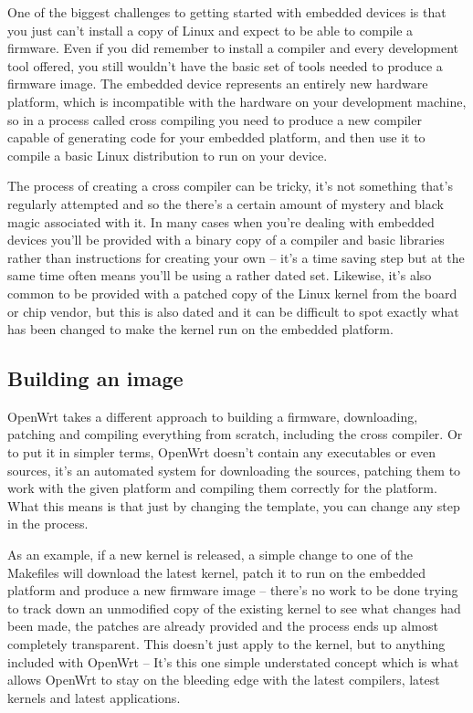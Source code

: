 One of the biggest challenges to getting started with embedded devices is that you
just can't install a copy of Linux and expect to be able to compile a firmware.
Even if you did remember to install a compiler and every development tool offered, 
you still wouldn't have the basic set of tools needed to produce a firmware image.
The embedded device represents an entirely new hardware platform, which is
incompatible with the hardware on your development machine, so in a process called 
cross compiling you need to produce a new compiler capable of generating code for
your embedded platform, and then use it to compile a basic Linux distribution to 
run on your device.

The process of creating a cross compiler can be tricky, it's not something that's 
regularly attempted and so the there's a certain amount of mystery and black magic 
associated with it. In many cases when you're dealing with embedded devices you'll
be provided with a binary copy of a compiler and basic libraries rather than 
instructions for creating your own -- it's a time saving step but at the same time 
often means you'll be using a rather dated set. Likewise, it's also common to be 
provided with a patched copy of the Linux kernel from the board or chip vendor, 
but this is also dated and it can be difficult to spot exactly what has been
changed to make the kernel run on the embedded platform.

\subsection{Building an image}

OpenWrt takes a different approach to building a firmware, downloading, patching
and compiling everything from scratch, including the cross compiler. Or to put it
in simpler terms, OpenWrt doesn't contain any executables or even sources, it's an 
automated system for downloading the sources, patching them to work with the given 
platform and compiling them correctly for the platform. What this means is that
just by changing the template, you can change any step in the process.


As an example, if a new kernel is released, a simple change to one of the Makefiles 
will download the latest kernel, patch it to run on the embedded platform and produce
a new firmware image -- there's no work to be done trying to track down an unmodified 
copy of the existing kernel to see what changes had been made, the patches are 
already provided and the process ends up almost completely transparent. This doesn't 
just apply to the kernel, but to anything included with OpenWrt -- It's this one
simple understated concept which is what allows OpenWrt to stay on the bleeding edge
with the latest compilers, latest kernels and latest applications.


